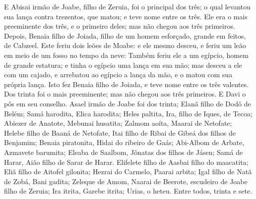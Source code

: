 {  E Abisai irmão de Joabe, filho de Zeruia, foi o principal dos três; o qual levantou sua lança contra trezentos, que matou; e teve nome entre os três.
  Ele era o mais preeminente dos três, e o primeiro deles; mas não chegou aos três primeiros.
  Depois, Benaia filho de Joiada, filho de um homem esforçado, grande em feitos, de Cabzeel. Este feriu dois leões de Moabe: e ele mesmo desceu, e feriu um leão em meio de um fosso no tempo da neve:
  Também feriu ele a um egípcio, homem de grande estatura; e tinha o egípcio uma lança em sua mão; mas desceu a ele com um cajado, e arrebatou ao egípcio a lança da mão, e o matou com sua própria lança.
  Isto fez Benaia filho de Joiada, e teve nome entre os três valentes.
  Dos trinta foi o mais preeminente; mas não chegou aos três primeiros. E Davi o pôs em seu conselho.
  Asael irmão de Joabe foi dos trinta; Elanã filho de Dodô de Belém;
  Samá harodita, Elica harodita;
  Heles paltita, Ira, filho de Iques, de Tecoa;
  Abiezer de Anatote, Mebunai husatita;
  Zalmom aoíta, Maarai de Netofate;
  Helebe filho de Baaná de Netofate, Itai filho de Ribai de Gibeá dos filhos de Benjamim;
  Benaia piratonita, Hidai do ribeiro de Gaás;
  Abi-Albom de Arbate, Azmavete barumita;
  Eleaba de Saalbom, Jônatas dos filhos de Jásen;
  Samá de Harar, Aião filho de Sarar de Harar.
  Elifelete filho de Aasbai filho do maacatita; Eliã filho de Aitofel gilonita;
  Hezrai do Carmelo, Paarai arbita;
  Igal filho de Natã de Zobá, Bani gadita;
  Zeleque de Amom, Naarai de Beerote, escudeiro de Joabe filho de Zeruia;
  Ira itrita, Garebe itrita;
  Urias, o heteu. Entre todos, trinta e sete.
\par }

